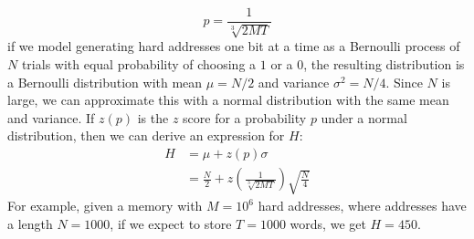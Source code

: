 \documentclass[journal, onecolumn, 12pt, draftclsnofoot]{IEEEtran}
\begin{document}
	\begin{equation}
		p = \frac{1}{\sqrt[3]{2MT}}
	\end{equation}
	if we model generating hard addresses one bit at a time as a Bernoulli process of $N$ trials with equal probability of choosing a $1$ or a $0$, the resulting distribution is a Bernoulli distribution with mean $\mu = N/2$ and variance $\sigma^2 = N/4$. Since $N$ is large, we can approximate this with a normal distribution with the same mean and variance. If $z(p)$ is the $z$ score for a probability $p$ under a normal distribution, then we can derive an expression for $H$:
	\begin{align}
		\label{eqn:optimal-h}
		H &= \mu + z(p) \sigma \\
		&= \frac{N}{2} + z \left( \frac{1}{\sqrt[3]{2MT}} \right) \sqrt{\frac{N}{4}}
	\end{align}
	For example, given a memory with $M = 10^6$ hard addresses, where addresses have a length $N = 1000$, if we expect to store $T=1000$ words, we get $H = 450$.
\end{document}

